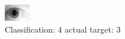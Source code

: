 \begin{figure}[h!]
\begin{center}
\includegraphics[width=0.60\columnwidth]{figures/ID1868_class_4_target_3.png}
\end{center}
\caption{ Classification: 4 actual target: 3}
\label{fig:ID1868_class_4_target_3}
\end{figure}
